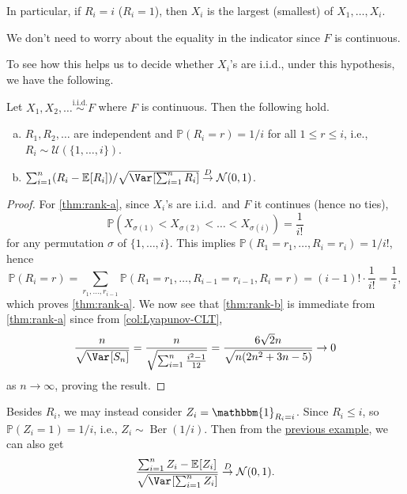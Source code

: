 \begin{eg}
	In particular, if \(R_i = i\) (\(R_i = 1\)), then \(X_i\) is the largest (smallest) of \(X_1, \dots , X_i\).
\end{eg}

\begin{note}
	We don't need to worry about the equality in the indicator since \(F\) is continuous.
\end{note}

To see how this helps us to decide whether \(X_i\)'s are i.i.d., under this hypothesis, we have the following.

\begin{theorem}\label{thm:rank}
	Let \(X_1, X_2 , \dots \overset{\text{i.i.d.} }{\sim } F\) where \(F\) is continuous. Then the following hold.
	\begin{enumerate}[(a)]
		\item\label{thm:rank-a} \(R_1, R_2, \dots \) are independent and \(\mathbb{P} (R_i = r) = 1 / i\) for all \(1 \leq r \leq i\), i.e., \(R_i \sim \mathcal{U} (\{ 1, \dots , i \} )\).
		\item\label{thm:rank-b} \(\sum_{i=1}^{n} (R_i - \mathbb{E}_{}[R_i] ) / \sqrt{\Var_{}[\sum_{i=1}^{n} R_i] } \overset{D}{\to} \mathcal{N} (0, 1)\).
	\end{enumerate}
\end{theorem}
\begin{proof}
	For \autoref{thm:rank-a}, since \(X_i\)'s are i.i.d.\ and \(F\) it continues (hence no ties),
	\[
		\mathbb{P} (X_{\sigma (1)} < X_{\sigma (2)} < \dots < X_{\sigma (i)})
		= \frac{1}{i!}
	\]
	for any permutation \(\sigma \) of \(\{ 1, \dots , i \} \). This implies \(\mathbb{P} (R_1 = r_1, \dots , R_i = r_i) = 1 / i!\), hence
	\[
		\mathbb{P} (R_i = r)
		= \sum_{r_1, \dots , r_{i-1}} \mathbb{P} (R_1 = r_1 , \dots , R_{i-1} = r_{i-1} , R_i = r)
		= (i - 1)! \cdot \frac{1}{i!}
		= \frac{1}{i},
	\]
	which proves \autoref{thm:rank-a}. We now see that \autoref{thm:rank-b} is immediate from \autoref{thm:rank-a} since from \autoref{col:Lyapunov-CLT},
	\[
		\frac{n}{\sqrt{\Var_{}[S_n] }}
		= \frac{n}{\sqrt{\sum_{i=1}^{n} \frac{i^2 - 1}{12}}}
		= \frac{6 \sqrt{2} n}{\sqrt{n (2 n^{2} + 3 n - 5)}}
		\to 0
	\]
	as \(n \to \infty \), proving the result.
\end{proof}

\begin{remark}
	Besides \(R_i\), we may instead consider \(Z_i = \mathbbm{1}_{R_i = i} \). Since \(R_i \leq i\), so \(\mathbb{P} (Z_i = 1) = 1 / i\), i.e., \(Z_i \sim \operatorname{Ber}(1 / i) \). Then from the \hyperref[eg:Lyapunov-CLT]{previous example}, we can also get
	\[
		\frac{\sum_{i=1}^{n} Z_i - \mathbb{E}_{}[Z_i] }{\sqrt{\Var_{}[\sum_{i=1}^{n} Z_i] } }
		\overset{D}{\to} \mathcal{N} (0, 1).
	\]
\end{remark}

